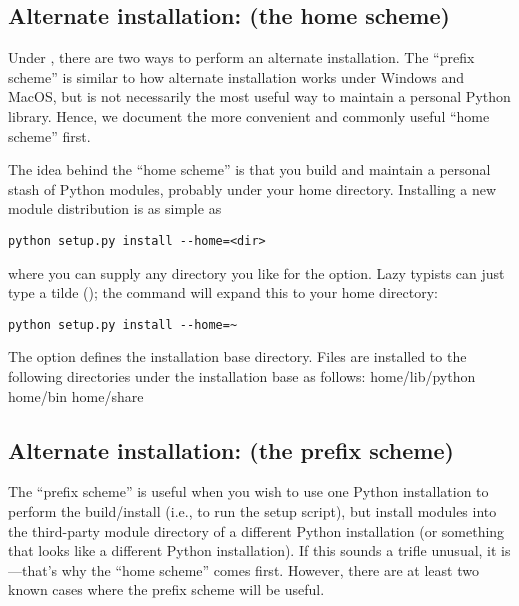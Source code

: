 \documentclass{howto}
\begin{document}
\subsection{Alternate installation: \UNIX{} (the home scheme)}
\label{alt-install-prefix}

Under \UNIX, there are two ways to perform an alternate installation.
The ``prefix scheme'' is similar to how alternate installation works
under Windows and MacOS, but is not necessarily the most useful way to
maintain a personal Python library.  Hence, we document the more
convenient and commonly useful ``home scheme'' first.

The idea behind the ``home scheme'' is that you build and maintain a
personal stash of Python modules, probably under your home directory.
Installing a new module distribution is as simple as

\begin{verbatim}
python setup.py install --home=<dir>
\end{verbatim}

where you can supply any directory you like for the 
option.  Lazy typists can just type a tilde (\code{\textasciitilde}); the
 command will expand this to your home directory:

\begin{verbatim}
python setup.py install --home=~
\end{verbatim}

The  option defines the installation base
directory.  Files are installed to the following directories under the
installation base as follows:
              {home}{/lib/python}
              {home}{/bin}
              {home}{/share}

\subsection{Alternate installation: \UNIX{} (the prefix scheme)}
\label{alt-install-home}

The ``prefix scheme'' is useful when you wish to use one Python
installation to perform the build/install (i.e., to run the setup
script), but install modules into the third-party module directory of a
different Python installation (or something that looks like a different
Python installation).  If this sounds a trifle unusual, it is---that's
why the ``home scheme'' comes first.  However, there are at least two
known cases where the prefix scheme will be useful.
\end{document}
